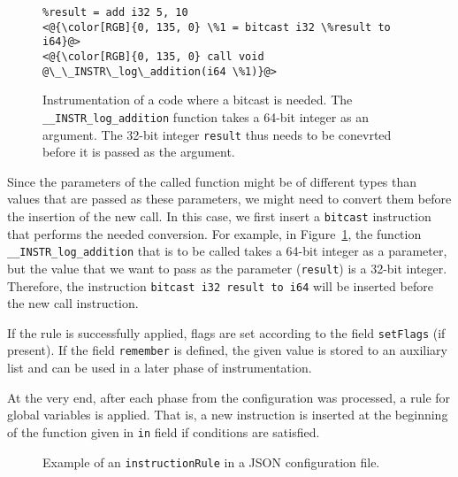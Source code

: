 \begin{figure}[h]
\begin{lstlisting}
%result = add i32 5, 10
<@{\color[RGB]{0, 135, 0} \%1 = bitcast i32 \%result to i64}@>
<@{\color[RGB]{0, 135, 0} call void @\_\_INSTR\_log\_addition(i64 \%1)}@>
\end{lstlisting}
\caption{Instrumentation of a code where a bitcast is needed. The
\texttt{\_\_INSTR\_log\_addition} function takes a 64-bit integer as an
argument. The 32-bit integer \texttt{result} thus needs to be conevrted before
it is passed as the argument.}
\label{fig:bitcast_example}
\end{figure}
Since the parameters of the called function might be of different types than
values that are passed as these parameters, we might need to convert them
before the insertion of the new call. In this case, we first insert a
\texttt{bitcast} instruction that performs the needed conversion. For example,
in Figure~\ref{fig:bitcast_example}, the function
\texttt{\_\_INSTR\_log\_addition} that is to be called takes a 64-bit integer
as a parameter, but the value that we want to pass as the parameter
(\texttt{result}) is a 32-bit integer. Therefore, the instruction \texttt{bitcast
i32 result to i64} will be inserted before the new call instruction.

If the rule is successfully applied, flags are set according to the field
\texttt{setFlags} (if present). If the field \texttt{remember} is defined, the
given value is stored to an auxiliary list and can be used in a later phase of
instrumentation.

At the very end, after each phase from the configuration was processed, a rule
for global variables is applied. That is, a new instruction is inserted at the
beginning of the function given in \texttt{in} field if conditions are
satisfied.


\begin{figure}[h]

\caption{Example of an \texttt{instructionRule} in a JSON configuration file.}
\label{fig:json_example}
\end{figure}

